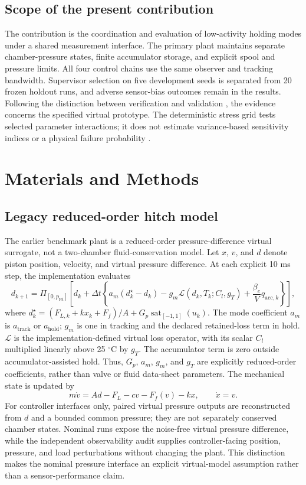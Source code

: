 \documentclass[machines,article,submit,pdftex,moreauthors]{Definitions/mdpi}
\begin{document}
\subsection{Scope of the present contribution}
The contribution is the coordination and evaluation of low-activity holding modes under a shared measurement interface. The primary plant maintains separate chamber-pressure states, finite accumulator storage, and explicit spool and pressure limits. All four control chains use the same observer and tracking bandwidth. Supervisor selection on five development seeds is separated from 20 frozen holdout runs, and adverse sensor-bias outcomes remain in the results. Following the distinction between verification and validation \cite{sargent2013}, the evidence concerns the specified virtual prototype. The deterministic stress grid tests selected parameter interactions; it does not estimate variance-based sensitivity indices or a physical failure probability \cite{saltelli2010}.

\section{Materials and Methods}
\subsection{Legacy reduced-order hitch model}
The earlier benchmark plant is a reduced-order pressure-difference virtual surrogate, not a two-chamber fluid-conservation model. Let $x$, $v$, and $d$ denote piston position, velocity, and virtual pressure difference. At each explicit 10 ms step, the implementation evaluates
\begin{equation}
 d_{k+1}=\Pi_{[0,p_{\mathrm{rel}}]}\left[d_k+\Delta t\left\{a_m(d_k^\star-d_k)-g_m\mathcal{L}(d_k,T_k;C_l,g_T)+\frac{\beta_e}{V}q_{\mathrm{acc},k}\right\}\right],
\end{equation}
where $d_k^\star=(F_{L,k}+kx_k+F_f)/A+G_p\operatorname{sat}_{[-1,1]}(u_k)$. The mode coefficient $a_m$ is $a_{\mathrm{track}}$ or $a_{\mathrm{hold}}$; $g_m$ is one in tracking and the declared retained-loss term in hold. $\mathcal{L}$ is the implementation-defined virtual loss operator, with its scalar $C_l$ multiplied linearly above 25 $^\circ$C by $g_T$. The accumulator term is zero outside accumulator-assisted hold. Thus, $G_p$, $a_m$, $g_m$, and $g_T$ are explicitly reduced-order coefficients, rather than valve or fluid data-sheet parameters. The mechanical state is updated by
\begin{equation}
 m\dot v=Ad-F_L-cv-F_f(v)-kx,\qquad \dot x=v.
\end{equation}
For controller interfaces only, paired virtual pressure outputs are reconstructed from $d$ and a bounded common pressure; they are not separately conserved chamber states. Nominal runs expose the noise-free virtual pressure difference, while the independent observability audit supplies controller-facing position, pressure, and load perturbations without changing the plant. This distinction makes the nominal pressure interface an explicit virtual-model assumption rather than a sensor-performance claim.
\end{document}
